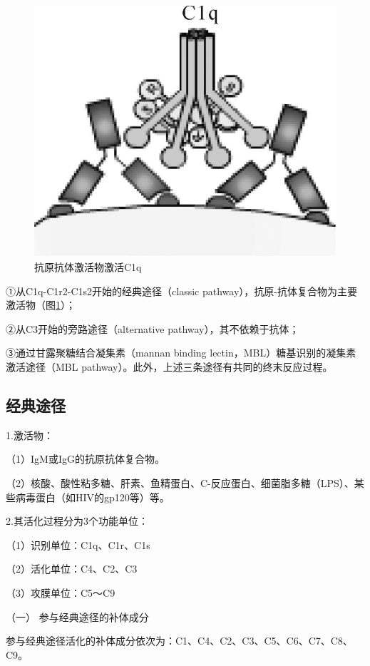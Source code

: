\begin{figure}[!htbp]
 \centering
 \includegraphics{./images/Image00079.jpg}
 \captionsetup{justification=centering}
 \caption{抗原抗体激活物激活C1q}
 \label{fig5-1}
  \end{figure} 

①从C1q-C1r2-C1s2开始的经典途径（classic
pathway），抗原-抗体复合物为主要激活物（图\ref{fig5-1}）；

②从C3开始的旁路途径（alternative pathway），其不依赖于抗体；

③通过甘露聚糖结合凝集素（mannan binding
lectin，MBL）糖基识别的凝集素激活途径（MBL
pathway）。此外，上述三条途径有共同的终末反应过程。


\subsection{经典途径}

1.激活物：

（1）IgM或IgG的抗原抗体复合物。

（2）核酸、酸性粘多糖、肝素、鱼精蛋白、C-反应蛋白、细菌脂多糖（LPS）、某些病毒蛋白（如HIV的gp120等）等。

2.其活化过程分为3个功能单位：

（1）识别单位：C1q、C1r、C1s

（2）活化单位：C4、C2、C3

（3）攻膜单位：C5～C9

（一） 参与经典途径的补体成分

参与经典途径活化的补体成分依次为：C1、C4、C2、C3、C5、C6、C7、C8、C9。

